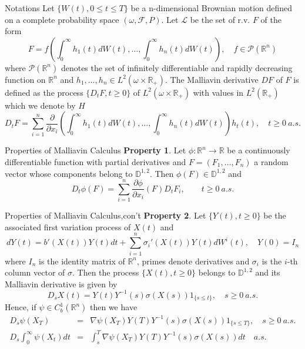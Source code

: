 \documentclass{beamer}
\begin{document}
\begin{frame}{Notations}
Let $\{W(t),0\leq t \leq T\}$ be a n-dimensional Brownian motion defined on a complete probability space $(\omega, \mathcal{F}, P)$. Let $\mathcal{L}$ be the set of r.v. $F$ of the form
$$
F = f\left( \int_0^\infty h_1(t)dW(t),\ldots, \int_0^\infty h_n(t)dW(t) \right), \quad f\in \mathcal{P}(\mathbb{R}^n)
$$
where $\mathcal{P}(\mathbb{R}^n)$ denotes the set of infinitely differentiable and rapidly decreasing function on $\mathbb{R}^n$ and $h_1,\ldots,h_n\in L^2(\omega \times \mathbb{R}_+)$. The Malliavin derivative $DF$ of $F$ is defined as the process $\{D_t F, t\geq 0\}$ of $L^2(\omega \times \mathbb{R}_+)$ with values in $L^2(\mathbb{R}_+)$ which we denote by $H$
$$
D_t F = \sum_{i=1}^{n} \frac{\partial}{\partial x_i} \left( \int_0^\infty h_1(t)dW(t),\ldots, \int_0^\infty h_n(t)dW(t) \right)h_t(t), \quad t\geq 0~a.s.
$$
\end{frame}


\begin{frame}{Properties of Malliavin Calculus}
\textbf{Property 1}. Let $\phi: \mathbb{R}^n \rightarrow \mathbb{R}$ be a continuously differentiable function with partial derivatives and $F=(F_1,\ldots,F_n)$ a random vector whose components belong to $\mathbb{D}^{1,2}$. Then $\phi(F)\in \mathbb{D}^{1,2}$ and
$$
D_t \phi(F) = \sum_{i=1}^{n} \frac{\partial \phi}{\partial x_i} (F) D_t F_i, \qquad t\geq 0~a.s.
$$
\end{frame}


\begin{frame}{Properties of Malliavin Calculus,con't}
\textbf{Property 2}. Let $\{Y(t), t\geq 0\}$ be the associated first variation process of $X(t)$ and
$$
dY(t) = b'(X(t))Y(t)dt + \sum_{i=1}^n \sigma_i'(X(t))Y(t) dW^i(t), \quad Y(0) = I_n
$$
where $I_n$ is the identity matrix of $\mathbb{R}^n$, primes denote derivatives and $\sigma_i$ is the
$i$-th column vector of $\sigma$. Then the process $\{X(t), t\geq 0\}$ belongs to $\mathbb{D}^{1,2}$ and its Malliavin derivative is given by
$$
D_s X(t) = Y(t)Y^{-1}(s)\sigma(X(s)) 1_{\{s\leq t\}}, \quad s\geq 0~a.s.
$$
Hence, if $\psi\in C^1_b(\mathbb{R}^n)$ then we have
\begin{eqnarray*}
D_s \psi(X_T) &=& \nabla \psi(X_T)Y(T)Y^{-1}(s)\sigma(X(s)) 1_{\{s\leq T\}}, \quad s\geq 0~a.s. \\
D_s \int_0^\infty \psi(X_t) dt &=& \int_s^T \nabla \psi(X_T)Y(T)Y^{-1}(s)\sigma(X(s)) dt \quad a.s. \\
\end{eqnarray*}
\end{frame}
\end{document}
